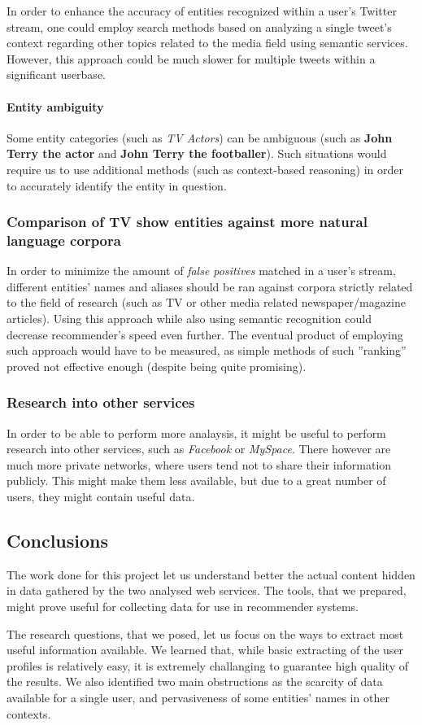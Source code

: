 In order to enhance the accuracy of entities recognized within a user's Twitter
stream, one could employ search methods based on analyzing a single tweet's
context regarding other topics related to the media field using semantic
services.  However, this approach could be much slower for multiple tweets
within a significant userbase.

\paragraph{Entity ambiguity}

Some entity categories (such as \textit{TV Actors}) can be ambiguous (such as \textbf{John Terry the actor} and \textbf{John Terry the footballer}). Such situations
would require us to use additional methods (such as context-based reasoning) in order to accurately identify the entity in question.

\subsubsection{Comparison of TV show entities against more natural language corpora}

In order to minimize the amount of \textit{false positives} matched in a user's
stream, different entities' names and aliases should be ran against corpora
strictly related to the field of research (such as TV or other media related
newspaper/magazine articles). Using this approach while also using semantic
recognition could decrease recommender's speed even further. The eventual
product of employing such approach would have to be measured, as simple methods
of such ''ranking'' proved not effective enough (despite being quite
promising).

\subsubsection{Research into other services}

In order to be able to perform more analaysis, it might be useful to perform
research into other services, such as \textit{Facebook} or \textit{MySpace}.
There however are much more private networks, where users tend not to share
their information publicly. This might make them less available, but due to a
great number of users, they might contain useful data.

\subsection{Conclusions}

The work done for this project let us understand better the actual content
hidden in data gathered by the two analysed web services. The tools, that we
prepared, might prove useful for collecting data for use in recommender systems.

The research questions, that we posed, let us focus on the ways to extract most
useful information available. We learned that, while basic extracting of the
user profiles is relatively easy, it is extremely challanging to guarantee high
quality of the results. We also identified two main obstructions as the
scarcity of data available for a single user, and pervasiveness of some
entities' names in other contexts.
